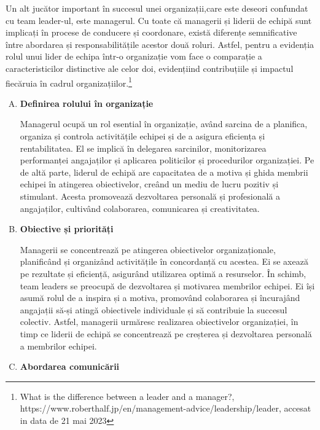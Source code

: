 \documentclass[a4paper, 12pt]{article}
\begin{document}
	\quad\quad Un alt jucător important în succesul unei organizații,care este deseori confundat cu team leader-ul, este managerul. Cu toate că managerii și liderii de echipă sunt implicați în procese de conducere și coordonare, există diferențe semnificative între abordarea și responsabilitățile acestor două roluri. Astfel, pentru a evidenția rolul unui lider de echipa într-o organizație vom face o comparație a caracteristicilor distinctive ale celor doi, evidențiind contribuțiile și impactul fiecăruia în cadrul organizațiilor.\footnote{What is the difference between a leader and a manager?, https://www.roberthalf.jp/en/management-advice/leadership/leader, accesat in data de 21 mai 2023}
\newpage

	\begin{enumerate}[A)]

		\item\textbf{Definirea rolului în organizație}
		
		\quad Managerul ocupă un rol esential în organizație, având sarcina de a planifica, organiza și controla activitățile echipei și de a asigura eficiența și rentabilitatea. El se implică în delegarea sarcinilor, monitorizarea performanței angajaților și aplicarea politicilor și procedurilor organizației. Pe de altă parte, liderul de echipă are capacitatea de a motiva și ghida membrii echipei în atingerea obiectivelor, creând un mediu de lucru pozitiv și stimulant. Acesta promovează dezvoltarea personală și profesională a angajaților, cultivând colaborarea, comunicarea și creativitatea.

		\item \textbf{Obiective și priorități}

		\quad\quad Managerii se concentrează pe atingerea obiectivelor organizaționale, planificând și organizând activitățile în concordanță cu acestea. Ei se axează pe rezultate și eficiență, asigurând utilizarea optimă a resurselor. În schimb, team leaders se preocupă de dezvoltarea și motivarea membrilor echipei. Ei își asumă rolul de a inspira și a motiva, promovând colaborarea și încurajând angajații să-și atingă obiectivele individuale și să contribuie la succesul colectiv. Astfel, managerii urmăresc realizarea obiectivelor organizației, în timp ce liderii de echipă se concentrează pe creșterea și dezvoltarea personală a membrilor echipei.

		\item \textbf{Abordarea comunicării}
		

\end{enumerate}
\end{document}

